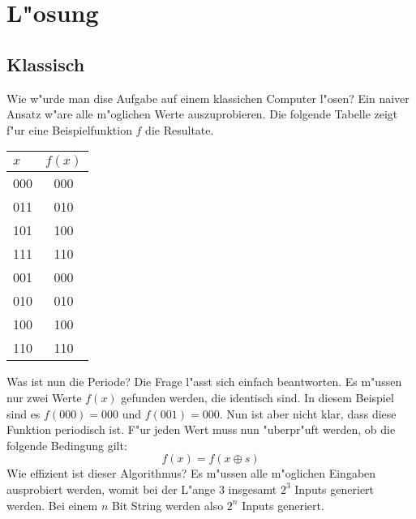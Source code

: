 \begin{refsection}
\begin{figure}[H]
\end{figure}

\section{L"osung}

\subsection{Klassisch}

Wie w"urde man dise Aufgabe auf einem klassichen Computer l"osen? Ein naiver
Ansatz w"are alle m"oglichen Werte auszuprobieren. Die folgende Tabelle zeigt
f"ur eine Beispielfunktion $f$ die Resultate.
\begin{center}
   \begin{tabular}{ l | c  }
    \hline
     $x$   & $f(x)$ \\ \hline
     000 & 000  \\ \hline
     011 & 010  \\ \hline
     101 & 100  \\ \hline
     111 & 110  \\ \hline
     001 & 000  \\ \hline
     010 & 010  \\ \hline
     100 & 100  \\ \hline
     110 & 110  \\ \hline
     \hline
    \end{tabular}
\end{center}
Was ist nun die Periode? Die Frage l"asst sich einfach beantworten. Es m"ussen
nur zwei Werte $f(x)$ gefunden werden, die identisch sind. In diesem Beispiel
sind es $f(000) = 000$ und $f(001) = 000$. 
Nun ist aber nicht klar, dass diese Funktion periodisch ist. F"ur jeden Wert
muss nun "uberpr"uft werden, ob die folgende Bedingung gilt:
\[
    f(x) = f(x \oplus s) 
\]
Wie effizient ist dieser Algorithmus? Es m"ussen alle m"oglichen Eingaben
ausprobiert werden, womit bei der L"ange $3$ insgesamt $2^3$ Inputs generiert
werden. Bei einem $n$ Bit String werden also $2^n$ Inputs generiert. 


\end{refsection}
